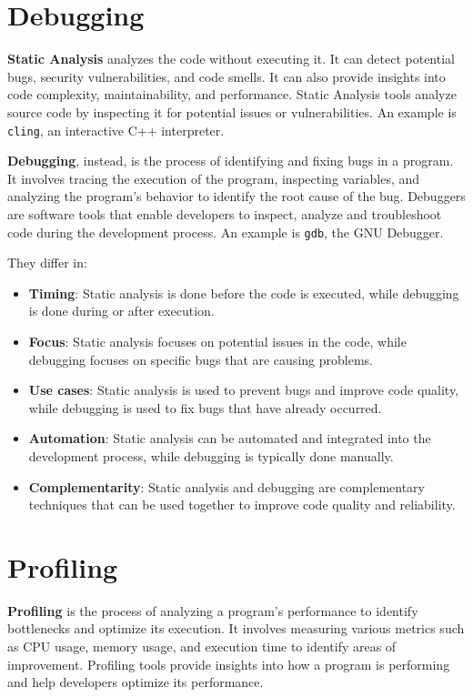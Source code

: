 \section{Debugging}

\textbf{Static Analysis} analyzes the code without executing it. It can detect potential bugs, security vulnerabilities, and code smells. It can also provide insights into code complexity, maintainability, and performance. Static Analysis tools analyze source code by inspecting it for potential issues or vulnerabilities. 
An example is \texttt{cling}, an interactive C++ interpreter.

\textbf{Debugging}, instead, is the process of identifying and fixing bugs in a program. It involves tracing the execution of the program, inspecting variables, and analyzing the program's behavior to identify the root cause of the bug. Debuggers are software tools that enable developers to inspect, analyze and troubleshoot code during the development process. An example is \texttt{gdb}, the GNU Debugger.

They differ in:
\begin{itemize}
    \item \textbf{Timing}: Static analysis is done before the code is executed, while debugging is done during or after execution.
    \item \textbf{Focus}: Static analysis focuses on potential issues in the code, while debugging focuses on specific bugs that are causing problems.
    \item \textbf{Use cases}: Static analysis is used to prevent bugs and improve code quality, while debugging is used to fix bugs that have already occurred.
    \item \textbf{Automation}: Static analysis can be automated and integrated into the development process, while debugging is typically done manually.
    \item \textbf{Complementarity}: Static analysis and debugging are complementary techniques that can be used together to improve code quality and reliability.
\end{itemize}

\section{Profiling}

\begin{definitionblock}
    \textbf{Profiling} is the process of analyzing a program's performance to identify bottlenecks and optimize its execution. It involves measuring various metrics such as CPU usage, memory usage, and execution time to identify areas of improvement. Profiling tools provide insights into how a program is performing and help developers optimize its performance.
\end{definitionblock}

